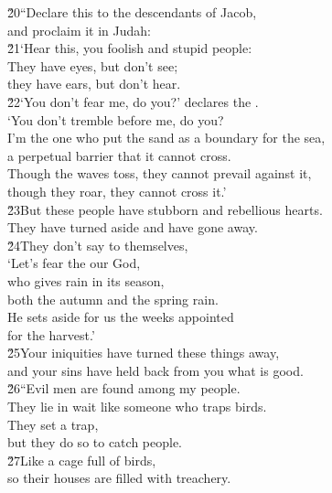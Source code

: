 \begin{poetry}
\poeml \v{20}``Declare this to the descendants of Jacob, \\
\poemll    and proclaim it in Judah: \\
\poeml \v{21}`Hear this, you foolish and stupid people: \\
\poemll    They have eyes, but don't see; \\
\poemlll       they have ears, but don't hear. \\
\poeml \v{22}`You don't fear me, do you?' declares the . \\
\poemll    `You don't tremble before me, do you? \\
\poeml I'm the one who put the sand as a boundary for the sea, \\
\poemll    a perpetual barrier that it cannot cross. \\
\poeml Though the waves toss, they cannot prevail against it, \\
\poemll    though they roar, they cannot cross it.' \\
\poeml \v{23}But these people have stubborn and rebellious hearts. \\
\poemll    They have turned aside and have gone away. \\
\poeml \v{24}They don't say to themselves, \\
\poemll    `Let's fear the  our God, \\
\poeml who gives rain in its season, \\
\poemll    both the autumn and the spring rain. \\
\poeml He sets aside for us the weeks appointed \\
\poemll    for the harvest.' \\
\poeml \v{25}Your iniquities have turned these things away, \\
\poemll    and your sins have held back from you what is good. \\
\poeml \v{26}``Evil men are found among my people. \\
\poemll    They lie in wait like someone who traps birds. \\
\poeml They set a trap, \\
\poemll    but they do so to catch people. \\
\poeml \v{27}Like a cage full of birds, \\
\poemll    so their houses are filled with treachery. \\

\end{poetry}
